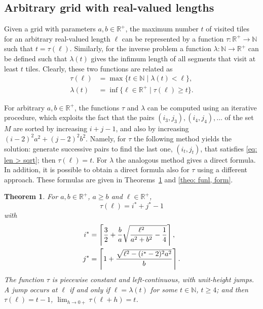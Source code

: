 \documentclass[12pt, a4paper]{article}
\newcommand{\st}{\mid}%
\let\Re\relax %
\DeclareMathOperator{\Re}{Re} %
\newcommand{\funt}{\tau} %
\newcommand{\funl}{\lambda} %
\newcommand{\len}{\ell} %
\newcommand{\tiles}{t} %
\newcommand{\isoli}{i^\ast}
\newcommand{\jsoli}{j^\ast}
\newcommand{\mss}{M}
\newtheorem{theorem}{Theorem}%
\begin{document}
\subsection{Arbitrary grid with real-valued lengths}
\label{part: max: arbitrary grid, real lengths}

Given a grid with parameters $a, b \in \mathbb R^+$, the maximum number $\tiles$ of visited tiles for an arbitrary real-valued length $\len$ can be represented by a function $\funt: \mathbb R^+ \to \mathbb N$ such that $\tiles = \funt(\len)$. Similarly, for the inverse problem a function $\funl: \mathbb N \to \mathbb R^+$ can be defined such that $\funl(\tiles)$ gives the infimum length of all segments that visit at least $\tiles$ tiles. Clearly, these two functions are related as
\begin{align}
\label{eq: funt funl}
\funt(\len) &= \max \{\tiles \in \mathbb N \st \funl(\tiles)<\len\},\\
\label{eq: funl funt}
\funl(\tiles) &= \inf\{\len \in \mathbb R^+ \st \funt(\len) \geq \tiles\}.
\end{align}

For arbitrary $a, b \in \mathbb R^+$, the functions $\funt$ and $\funl$ can be computed using an iterative procedure, which exploits the fact that the pairs $(i_3,j_3), (i_4,j_4), \ldots$ of the set $\mss$ are sorted by increasing $i+j-1$, and also by increasing $(i-2)^2 a^2 + (j-2)^2 b^2$. Namely, for $\funt$ the following method yields the solution: generate successive pairs to find the last one, $(i_\tiles,j_\tiles)$, that satisfies \eqref{eq: len > sqrt}; then $\funt(\len) = \tiles$. For $\funl$ the analogous method gives a direct formula. In addition, it is possible to obtain a direct formula also for $\funt$ using a different approach. These formulas are given in Theorems~\ref{theo: funt, form} and \ref{theo: funl, form}.

\begin{theorem}
\label{theo: funt, form}
For $a, b \in \mathbb R^+$, $a \geq b$ and $\len \in \mathbb R^+$,
\begin{equation}
\label{eq: theo: funt, form; funt}
\funt(\len) = \isoli+\jsoli-1
\end{equation}
with
\begin{align}
\label{eq: theo: funt, form; i}
\isoli &= \left\lceil \frac 3 2 + \frac b a \Re \sqrt{\frac{\len^2}{a^2+b^2}-\frac 1 4} \right\rceil, \\
\label{eq: theo: funt, form; j}
\jsoli &= \left\lceil 1 + \frac{\sqrt{\len^2-(\isoli-2)^2a^2}}{b} \right\rceil.
\end{align}
The function $\funt$ is piecewise constant and left-continuous, with unit-height jumps. A jump occurs at $\len$ if and only if $\len = \funl(\tiles)$ for some $\tiles \in \mathbb N$, $\tiles \geq 4$; and then $\funt(\len) = \tiles-1$, $\lim_{h \rightarrow 0+} \funt(\len+h) = \tiles$.
\end{theorem}
\end{document}
